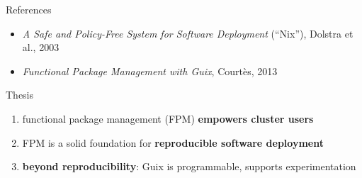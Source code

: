 \documentclass{beamer}
\begin{document}
\begin{frame}{References}
  \Large{
    \begin{itemize}
    \item \textit{A Safe and Policy-Free System for Software Deployment}
      (``Nix''), Dolstra et al., 2003
    \item \textit{Functional Package Management with Guix}, Courtès,
      2013
    \end{itemize}
  }
\end{frame}

\begin{frame}{Thesis}

  \Large{
    \begin{enumerate}
    \item functional package management (FPM) \textbf{empowers cluster
      users}
    \item FPM is a solid foundation for \textbf{reproducible software
      deployment}
    \item \textbf{beyond reproducibility}: Guix is programmable, supports
      experimentation
    \end{enumerate}
  }
\end{frame}
\end{document}
